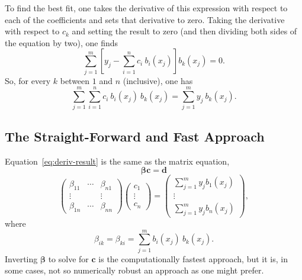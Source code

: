 \documentclass[twocolumn]{article}
\begin{document}
To find the best fit, one takes the derivative of this expression with respect
to each of the coefficients and sets that derivative to zero. Taking the
derivative with respect to $c_k$ and setting the result to zero (and then
dividing both sides of the equation by two), one finds
\begin{equation}
   \sum_{j=1}^{m} \left[ y_j - \sum_{i=1}^{n} c_i \: b_i(x_j) \right] b_k(x_j)
   = 0.
\end{equation}
So, for every $k$ between $1$ and $n$ (inclusive), one has
\begin{equation}
   \sum_{j=1}^{m} \sum_{i=1}^{n} c_i \: b_i(x_j) \: b_k(x_j) = \sum_{j=1}^{m}
   y_j \: b_k(x_j).
   \label{eq:deriv-result}
\end{equation}

\subsection{The Straight-Forward and Fast Approach}

Equation~\ref{eq:deriv-result} is the same as the matrix equation,
\begin{equation}
   \boldsymbol{\beta} \mathbf{c} = \mathbf{d}
   \label{eq:beta}
\end{equation}
\begin{equation}
   \begin{pmatrix}
      \beta_{11} & \cdots & \beta_{n1}\\
      \vdots & & \vdots\\
      \beta_{1n} & \cdots & \beta_{nn}
   \end{pmatrix}
   \begin{pmatrix}
      c_1\\
      \vdots\\
      c_n
   \end{pmatrix}
   =
   \begin{pmatrix}
      \sum_{j=1}^{m} y_j b_1(x_j)\\
      \vdots\\
      \sum_{j=1}^{m} y_j b_n(x_j)
   \end{pmatrix},
\end{equation}
where
\begin{equation}
   \beta_{ik} = \beta_{ki} = \sum_{j=1}^m b_i(x_j) \: b_k(x_j).
\end{equation}
Inverting $\boldsymbol{\beta}$ to solve for $\mathbf{c}$ is the computationally
fastest approach, but it is, in some cases, not so numerically robust an
approach as one might prefer.
\end{document}
